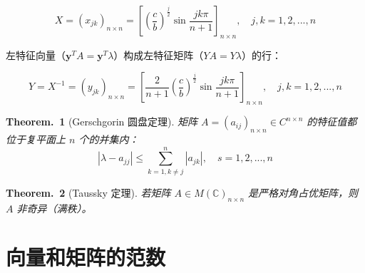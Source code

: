 \documentclass[zihao=5,UTF8]{report}
\def\C{\mathbb{C}}
\theoremstyle{MyTheoremStyle} %
\newtheorem{theorem}{Theorem.\,}
\theoremstyle{MySubsubsectionStyle} %
\begin{document}
\begin{equation}
    X=(x_{jk})_{n\times n} = \left[\left(\frac{c}{b}\right)^{\frac{j}{2}}\sin\frac{jk\pi}{n+1}\right]_{n\times n},\quad j,k=1,2,...,n
\end{equation}

左特征向量（$\boldsymbol{y}^TA  =  \boldsymbol{y}^T\lambda$）构成左特征矩阵（$YA = Y\lambda $）的行：

\begin{equation}
    Y = X^{-1}=(y_{jk})_{n\times n} = \left[\frac{2}{n+1}\left(\frac{c}{b}\right)^{\frac{j}{2}}\sin\frac{jk\pi}{n+1}\right]_{n\times n},\quad j,k=1,2,...,n
\end{equation}

\begin{theorem}[Gerschgorin 圆盘定理]\label{Gerschgorin 圆盘定理}
    矩阵 $A = (a_{ij})_{n \times n}\in C^{n\times n} $ 的特征值都位于复平面上 $n$ 个的并集内：
    \begin{equation}
        |\lambda-a_{jj}|\leqslant\sum_{k=1,k\neq j}^n|a_{jk}|,\quad s=1,2,...,n
    \end{equation}

\end{theorem}


\begin{theorem}[Taussky 定理]\label{Taussky 定理}
若矩阵 $A \in M(\C)_{n\times n}$ 是严格对角占优矩阵，则 $A$ 非奇异（满秩）。
\end{theorem}

\section{向量和矩阵的范数}
\end{document}
